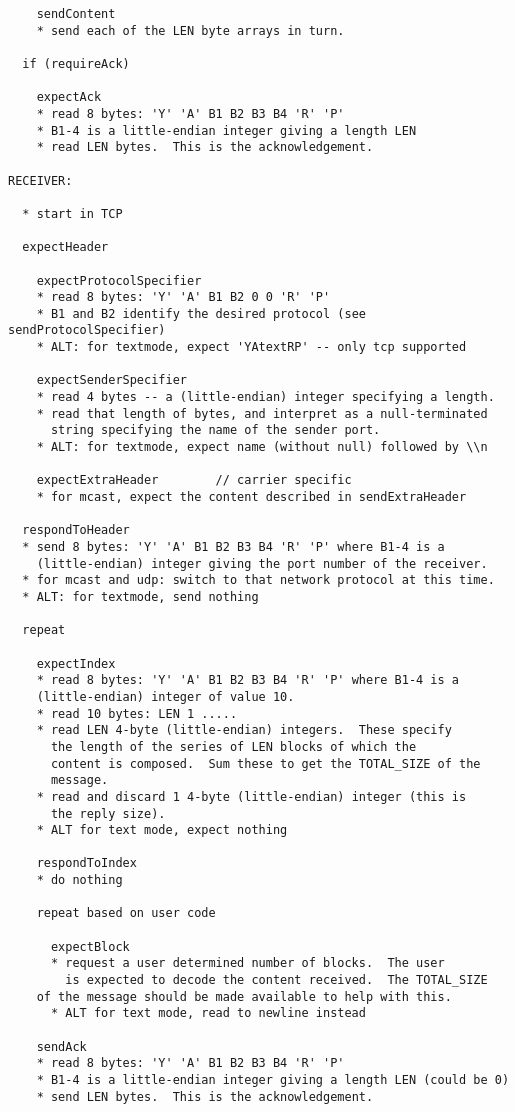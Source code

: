 \begin{verbatim}
    sendContent
    * send each of the LEN byte arrays in turn.

  if (requireAck)

    expectAck
    * read 8 bytes: 'Y' 'A' B1 B2 B3 B4 'R' 'P'
    * B1-4 is a little-endian integer giving a length LEN
    * read LEN bytes.  This is the acknowledgement.

RECEIVER:

  * start in TCP

  expectHeader

    expectProtocolSpecifier
    * read 8 bytes: 'Y' 'A' B1 B2 0 0 'R' 'P'
    * B1 and B2 identify the desired protocol (see sendProtocolSpecifier)
    * ALT: for textmode, expect 'YAtextRP' -- only tcp supported

    expectSenderSpecifier
    * read 4 bytes -- a (little-endian) integer specifying a length.
    * read that length of bytes, and interpret as a null-terminated
      string specifying the name of the sender port.
    * ALT: for textmode, expect name (without null) followed by \\n

    expectExtraHeader        // carrier specific
    * for mcast, expect the content described in sendExtraHeader

  respondToHeader
  * send 8 bytes: 'Y' 'A' B1 B2 B3 B4 'R' 'P' where B1-4 is a 
    (little-endian) integer giving the port number of the receiver.
  * for mcast and udp: switch to that network protocol at this time.
  * ALT: for textmode, send nothing

  repeat

    expectIndex
    * read 8 bytes: 'Y' 'A' B1 B2 B3 B4 'R' 'P' where B1-4 is a 
    (little-endian) integer of value 10.
    * read 10 bytes: LEN 1 .....
    * read LEN 4-byte (little-endian) integers.  These specify
      the length of the series of LEN blocks of which the
      content is composed.  Sum these to get the TOTAL_SIZE of the 
      message.
    * read and discard 1 4-byte (little-endian) integer (this is
      the reply size).
    * ALT for text mode, expect nothing

    respondToIndex
    * do nothing

    repeat based on user code
    
      expectBlock
      * request a user determined number of blocks.  The user
        is expected to decode the content received.  The TOTAL_SIZE
	of the message should be made available to help with this.
      * ALT for text mode, read to newline instead

    sendAck
    * read 8 bytes: 'Y' 'A' B1 B2 B3 B4 'R' 'P'
    * B1-4 is a little-endian integer giving a length LEN (could be 0)
    * send LEN bytes.  This is the acknowledgement.


\end{verbatim}


